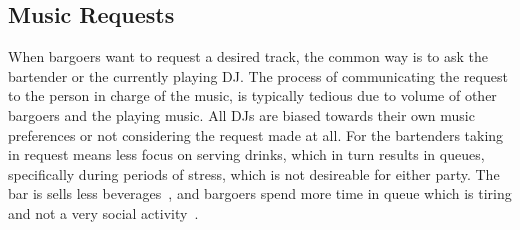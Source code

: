 \subsection{Music Requests}

When bargoers want to request a desired track, the common way is to ask the bartender or the currently playing DJ. The process of communicating the request to the person in charge of the music, is typically tedious due to volume of other bargoers and the playing music. All DJs are biased towards their own music preferences or not considering the request made at all. For the bartenders taking in request means less focus on serving drinks, which in turn results in queues, specifically during periods of stress, which is not desireable for either party. The bar is sells less beverages~\cite{Queues gives lower income}, and bargoers spend more time in queue which is tiring and not a very social activity~\cite{Queues er træls}.
